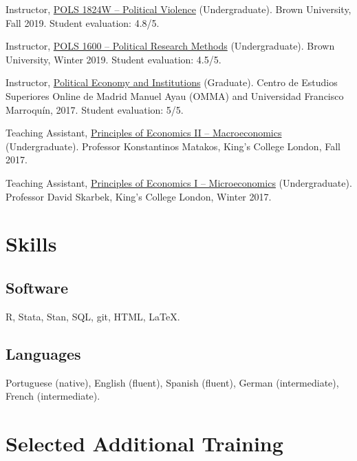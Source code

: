 \documentclass[a4paper]{article}
\renewenvironment{itemize}{
	\begin{list}{}{
			\setlength{\leftmargin}{1.5em}
		}
		}{
	\end{list}
}
\begin{document}
\begin{itemize}
\item Instructor, \href{http://danilofreire.github.io/pols1842w}{POLS 1824W -- Political Violence} (Undergraduate). Brown University, Fall 2019. Student evaluation: 4.8/5.
\item Instructor, \href{http://danilofreire.github.io}{POLS 1600 -- Political Research Methods} (Undergraduate). Brown University, Winter 2019. Student evaluation: 4.5/5.
\item Instructor, \href{https://github.com/danilofreire/economia-politica-instituicoes-ufm}{Political Economy and Institutions} (Graduate). Centro de Estudios Superiores Online de Madrid Manuel Ayau (OMMA) and Universidad Francisco Marroquín, 2017. Student evaluation: 5/5.
\item Teaching Assistant, \href{https://github.com/danilofreire/core-econ}{Principles of Economics II -- Macroeconomics} (Undergraduate). Professor Konstantinos Matakos, King's College London, Fall 2017.
\item Teaching Assistant, \href{https://github.com/danilofreire/core-econ}{Principles of Economics I -- Microeconomics} (Undergraduate). Professor David Skarbek, King's College London, Winter 2017.
\end{itemize}

\section*{Skills}

\subsection*{Software}

\begin{itemize}
\item R, Stata, Stan, SQL, git, HTML, \LaTeX{}.
\end{itemize}

\subsection*{Languages}

\begin{itemize}
\item Portuguese (native), English (fluent), Spanish (fluent), German (intermediate), French (intermediate).
\end{itemize}

\section*{Selected Additional Training}
\end{document}
